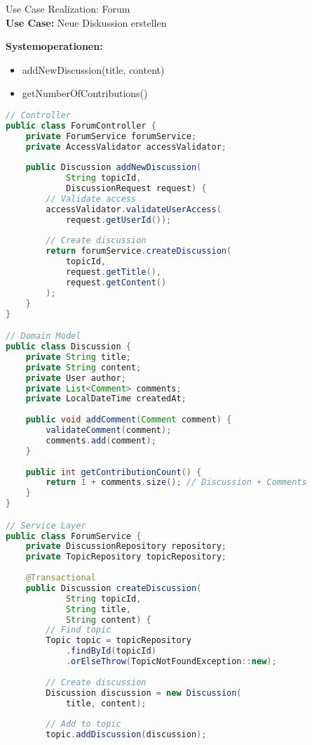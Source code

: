 \begin{example2}[breakable]{Use Case Realization: Forum}\\
\textbf{Use Case:} Neue Diskussion erstellen

\textbf{Systemoperationen:}
\begin{itemize}
    \item addNewDiscussion(title, content)
    \item getNumberOfContributions()
\end{itemize}

\begin{lstlisting}[language=Java, style=basesmol]
// Controller
public class ForumController {
    private ForumService forumService;
    private AccessValidator accessValidator;
    
    public Discussion addNewDiscussion(
            String topicId, 
            DiscussionRequest request) {
        // Validate access
        accessValidator.validateUserAccess(
            request.getUserId());
            
        // Create discussion
        return forumService.createDiscussion(
            topicId, 
            request.getTitle(),
            request.getContent()
        );
    }
}

// Domain Model
public class Discussion {
    private String title;
    private String content;
    private User author;
    private List<Comment> comments;
    private LocalDateTime createdAt;
    
    public void addComment(Comment comment) {
        validateComment(comment);
        comments.add(comment);
    }
    
    public int getContributionCount() {
        return 1 + comments.size(); // Discussion + Comments
    }
}

// Service Layer
public class ForumService {
    private DiscussionRepository repository;
    private TopicRepository topicRepository;
    
    @Transactional
    public Discussion createDiscussion(
            String topicId,
            String title,
            String content) {
        // Find topic
        Topic topic = topicRepository
            .findById(topicId)
            .orElseThrow(TopicNotFoundException::new);
            
        // Create discussion
        Discussion discussion = new Discussion(
            title, content);
            
        // Add to topic
        topic.addDiscussion(discussion);
        

\end{lstlisting}
\end{example2}
